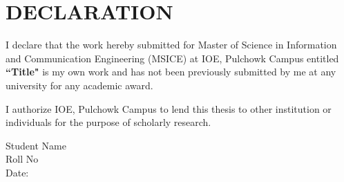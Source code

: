 \chapter*{DECLARATION}
I declare that the work hereby submitted for Master of Science in Information and Communication Engineering (MSICE) at IOE, Pulchowk Campus entitled \textbf{ ``Title"} is my own work and has not been previously submitted by me at any university for any academic award.\par
I authorize IOE, Pulchowk Campus to lend this thesis to other institution or individuals for the purpose of scholarly research.\par
\vspace{1.5cm}

Student Name\\
Roll No\\
Date: \\
\newpage